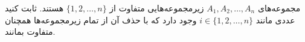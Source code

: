 مجموعه‌های $A_1, A_2, \dots, A_n$ زیرمجموعه‌هایی متفاوت از $\{1, 2, \dots , n\}$ هستند.
ثابت کنید عددی مانند $i \in \{1, 2, \dots , n\}$ وجود دارد که با حذف آن از تمام زیرمجموعه‌ها همچنان متفاوت بمانند.